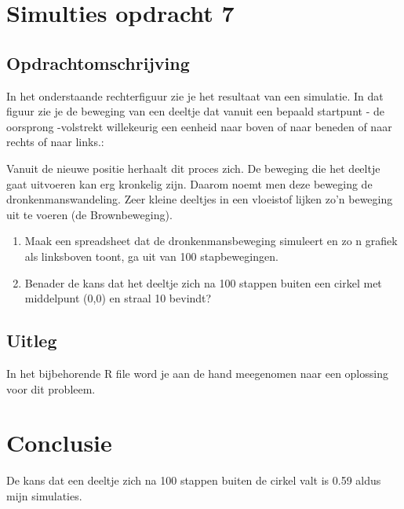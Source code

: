 \documentclass{article}
\begin{document}



\section{Simulties opdracht 7}
\label{sec:sample_main}

\subsection{Opdrachtomschrijving}
\label{subsec:sample_opdrom}

In het onderstaande rechterfiguur zie je het resultaat van een simulatie. In dat figuur zie je de beweging van een deeltje dat vanuit een bepaald startpunt - de oorsprong -volstrekt willekeurig een eenheid naar boven of naar beneden of naar rechts of naar links.:

Vanuit de nieuwe positie herhaalt dit proces zich. De beweging die het deeltje gaat uitvoeren kan erg kronkelig zijn. Daarom noemt men deze beweging de dronkenmanswandeling. Zeer kleine deeltjes in een vloeistof lijken zo'n beweging uit te voeren (de Brownbeweging).

\begin{enumerate}[label=(\Alph*)]

\item Maak een spreadsheet dat de dronkenmansbeweging simuleert en zo n grafiek als linksboven toont, ga uit van 100 stapbewegingen.

\item Benader de kans dat het deeltje zich na 100 stappen buiten een cirkel met middelpunt (0,0) en straal 10 bevindt?

\end{enumerate}

\newpage
\subsection{Uitleg}
\label{subsec:sample_uitv}

In het bijbehorende R file word je aan de hand meegenomen naar een oplossing voor dit probleem.


\section{Conclusie}
\label{subsec:sample_con}
De kans dat een deeltje zich na 100 stappen buiten de cirkel valt is 0.59 aldus mijn simulaties.
\end{document}
